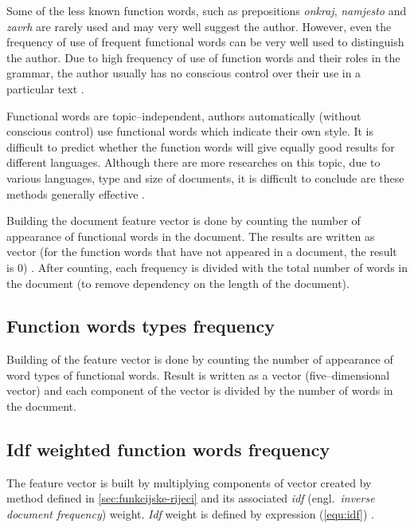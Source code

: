 \documentclass[11pt,english]{article}
\newcommand{\engl}[1]{(engl.~\emph{#1})}
\begin{document}
\begin{multicols}{2}
Some of the less known function words, such as prepositions \emph{onkraj},
\emph{namjesto} and \emph{zavrh} are rarely used and may very well suggest the
author. However, even the frequency of use of frequent functional words can be
very well used to distinguish the author. Due to high frequency of use of
function words and their roles in the grammar, the author usually has no
conscious control over their use in a particular text
\citep{argamon2005measuring}.

Functional words are topic--independent, authors automatically (without conscious
control) use functional words which indicate their own style.
It is difficult to predict whether the function words will give equally good
results for different languages. Although there are more researches on this
topic, due to various languages, type and size of documents, it is difficult to
conclude are these methods generally effective \citep{zhao2005effective}.

Building the document feature vector is done by counting the number of appearance
of functional words in the document. The results are written as vector (for
the function words that have not appeared in a document, the result is 0) . After
counting, each frequency is divided with the total number of words in the
document (to remove dependency on the length of the document).

\subsection{Function words types frequency}
\label{sec:funkcijske-rijeci-grupe}
Building of the feature vector is done by counting the number of appearance of
word types of functional words. Result is written as a vector (five--dimensional
vector) and each component of the vector is divided by the number of words in the
document.

\subsection{Idf weighted function words frequency}
\label{sec:funkcijske-rijeci-idf}
The feature vector is built by multiplying components of vector created by method
defined in \ref{sec:funkcijske-rijeci} and its associated \emph{idf}
\engl{inverse document frequency} weight. \emph{Idf} weight is defined by
expression (\ref{equ:idf}) \citep{diederich2003authorship}.


\end{multicols}
\end{document}
